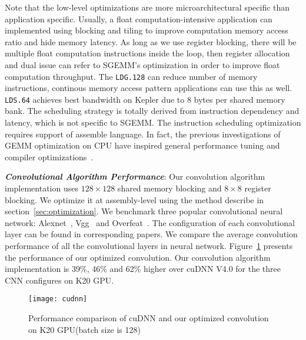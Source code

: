 Note that the low-level optimizations are more microarchitectural specific than application specific. 
Usually, a float computation-intensive application can implemented using
blocking and tiling to improve computation memory access ratio and hide memory latency. As long as we use
register blocking, there will be multiple float computation instructions inside
the loop, then register allocation and dual issue can refer to SGEMM's
optimization in order to improve float computation throughput. 
The {\tt LDG.128} can reduce number of memory instructions, continous memory
access pattern applications can use this as well.
{\tt LDS.64} achieves best bandwidth on Kepler due to 8 bytes per shared memory bank. 
The scheduling strategy is totally derived from instruction dependency and latency,
which is not specific to SGEMM. 
The instruction scheduling optimization requires support of assemble language.
In fact, the previous investigations of GEMM optimization on CPU have inspired
general performance tuning and compiler optimizations~\cite{lam1991cache}.  

{\em {\bf Convolutional Algorithm Performance}}:
Our convolution algorithm implementation uses $128\times128$ shared memory blocking and
$8\times8$ register blocking. We optimize it at assembly-level using the method describe in section~\ref{sec:optimization}.
We benchmark three popular convolutional neural network:
Alexnet~\cite{krizhevsky2012imagenet}, Vgg~\cite{simonyan2014very} and
Overfeat~\cite{sermanet2013overfeat}.  The configuration of each convolutional
layer can be found in corresponding papers.
We compare the average convolution performance of all the convolutional layers in neural network. 
Figure~\ref{fig:conv} presents the performance of our optimized convolution. %
Our convolution algorithm implementation is 39\%, 46\% and 62\% higher over cuDNN V4.0 for the three CNN configures on K20 GPU.

\begin{figure}[htbp]
\begin{center}
\texttt{[image: cudnn]}
    \caption{Performance comparison of cuDNN and our optimized convolution on K20 GPU(batch size is 128)}
\label{fig:conv}
\end{center}
\end{figure}
